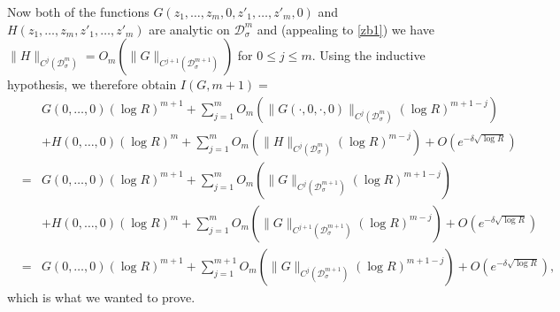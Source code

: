 \documentclass[12pt,a4paper,reqno]{amsart}
\numberwithin{equation}{section}
\theoremstyle{plain}
\theoremstyle{definition}
\renewcommand{\leq}{\leqslant}
\def\D{{\mathcal D}}
\def\ni{\noindent}
\def\endproof{\hfill{\usebox{\proofbox}}}
\begin{document}
\ni Now both of the functions $G(z_1,\dots,z_m,0,z'_1,\dots,z'_m,0)$ and $H(z_1,\dots,z_m,z'_1,\dots,z'_m)$ are analytic on
$\D^m_\sigma$ and (appealing to \eqref{zb1}) we have
$\|H\|_{C^j(\mathcal{D}^m_\sigma)} = O_m(\|G\|_{C^{j+1}(\mathcal{D}^{m+1}_\sigma)})$ for
$0 \leq j \leq m$. Using the inductive hypothesis,
we therefore obtain $I(G,m+1) = $
\begin{eqnarray*}
&  & G(0,\dots,0) (\log R)^{m + 1} + \sum_{j=1}^m O_m(\|G(\cdot,0,\cdot,0)\|_{C^j(\mathcal{D}^m_\sigma)}(\log R)^{m + 1 -j}) \\ & &  + H(0,\dots,0) (\log R)^{m} + \sum_{j=1}^m O_m(\|H\|_{C^j(\mathcal{D}^m_\sigma)}(\log R)^{m  -j}) + O(e^{-\delta\sqrt{\log R}})
 \\ & = & G(0,\dots,0)(\log R)^{m+1} + \sum_{j=1}^m O_m(\|G\|_{C^j(\mathcal{D}^{m+1}_\sigma)}(\log R)^{m + 1 -j}) \\ & & + H(0,\dots,0) (\log R)^{m} + \sum_{j=1}^m O_m(\|G\|_{C^{j+1}(\mathcal{D}^{m+1}_\sigma)}(\log R)^{m  -j}) + O(e^{-\delta\sqrt{\log R}})\\
 & = & G(0,\dots,0)(\log R)^{m+1} + \sum_{j=1}^{m+1} O_m(\|G\|_{C^j(\mathcal{D}^{m+1}_\sigma)}(\log R)^{m + 1 -j}) + O(e^{-\delta\sqrt{\log R}}),\end{eqnarray*}which is what we wanted to prove.\endproof
\end{document}
